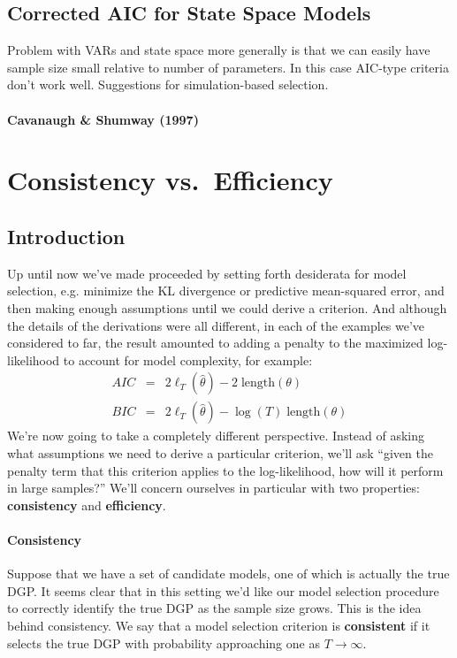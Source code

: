 \documentclass[12pt]{article}
\theoremstyle{definition}
\begin{document}
\subsection{Corrected AIC for State Space Models}
Problem with VARs and state space more generally is that we can easily have sample size small relative to number of parameters. In this case AIC-type criteria don't work well. Suggestions for simulation-based selection.

\paragraph{Cavanaugh \& Shumway (1997)} 


\section{Consistency vs.\ Efficiency}

\subsection{Introduction}
Up until now we've made proceeded by setting forth desiderata for model selection, e.g. minimize the KL divergence or predictive mean-squared error, and then making enough assumptions until we could derive a criterion. And although the details of the derivations were all different, in each of the examples we've considered to far, the result amounted to adding a penalty to the maximized log-likelihood to account for model complexity, for example:
	\begin{eqnarray*}
		AIC &=& 2\ell_T(\widehat{\theta}) - 2\; \mbox{length}(\theta)\\
		BIC &=& 2\ell_T(\widehat{\theta}) - \log(T)\; \mbox{length}(\theta)
	\end{eqnarray*}
We're now going to take a completely different perspective. Instead of asking what assumptions we need to derive a particular criterion, we'll ask ``given the penalty term that this criterion applies to the log-likelihood, how will it perform in large samples?'' We'll concern ourselves in particular with two properties: \textbf{consistency} and \textbf{efficiency}. 

\paragraph{Consistency} Suppose that we have a set of candidate models, one of which is actually the true DGP. It seems clear that in this setting we'd like our model selection procedure to correctly identify the true DGP as the sample size grows. This is the idea behind consistency. We say that a model selection criterion is \textbf{consistent} if it selects the true DGP with probability approaching one as $T\rightarrow \infty$. 
\end{document}
